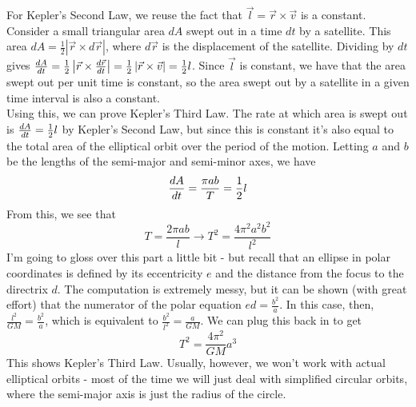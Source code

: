 For Kepler's Second Law, we reuse the fact that $\vec l = \vec r \times \vec v$ is a constant. Consider a small triangular area $dA$ swept out in a time $dt$ by a satellite. This area $dA = \frac{1}{2}| \vec r \times d\vec r |$, where $d\vec r$ is the displacement of the satellite. Dividing by $dt$ gives $\frac{d A}{d t} = \frac{1}{2} \left| \vec r \times \frac{d \vec r}{d t} \right| = \frac{1}{2} \left| \vec r \times \vec v \right| = \frac{1}{2} l$. Since $\vec l$ is constant, we have that the area swept out per unit time is constant, so the area swept out by a satellite in a given time interval is also a constant. \\
Using this, we can prove Kepler's Third Law. The rate at which area is swept out is $\frac{d A}{d t} = \frac{1}{2} l$ by Kepler's Second Law, but since this is constant it's also equal to the total area of the elliptical orbit over the period of the motion. Letting $a$ and $b$ be the lengths of the semi-major and semi-minor axes, we have 
\[
	\frac{d A}{d t} = \frac{\pi a b}{T} = \frac{1}{2}l
\]
From this, we see that 
\[
	T = \frac{2\pi a b}{l} \rightarrow T^2 = \frac{4\pi^2 a^2 b^2}{l^2}
\]
I'm going to gloss over this part a little bit - but recall that an ellipse in polar coordinates is defined by its eccentricity $e$ and the distance from the focus to the directrix $d$. The computation is extremely messy, but it can be shown (with great effort) that the numerator of the polar equation $ed = \frac{b^2}{a}$. In this case, then, $\frac{l^2}{GM} = \frac{b^2}{a}$, which is equivalent to $\frac{b^2}{l^2} = \frac{a}{GM}$. We can plug this back in to get
\[
	T^2 = \frac{4\pi^2}{GM}a^3
\]
This shows Kepler's Third Law. Usually, however, we won't work with actual elliptical orbits - most of the time we will just deal with simplified circular orbits, where the semi-major axis is just the radius of the circle. 